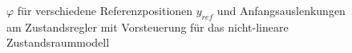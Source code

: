 \documentclass[
	pagesize,
	fontsize=12pt,
	paper=a4,
	oneside,
   reqno
]{scrartcl}
\begin{document}
\begin{figure}[H]
    \centering
    \caption[$\varphi$ für Regler mit Vorsteuerung (nicht-linear)]{$\varphi$ für verschiedene Referenzpositionen $y_{ref}$ und Anfangsauslenkungen am Zustandsregler mit Vorsteuerung für das nicht-lineare Zustandsraummodell}
    \label{fig:Bild24}
\end{figure}
\end{document}
